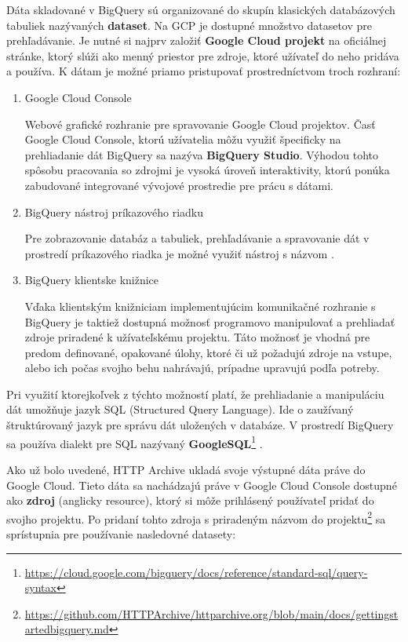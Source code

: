 Dáta skladované v BigQuery sú organizované do skupín klasických databázových tabuliek nazývaných \textbf{dataset}.
Na GCP je dostupné množstvo datasetov pre prehľadávanie.
Je nutné si najprv založiť \textbf{Google Cloud projekt} na oficiálnej stránke, ktorý slúži ako menný priestor pre zdroje, ktoré užívateľ do neho pridáva a používa.
K dátam je možné priamo pristupovať prostredníctvom troch rozhraní: \cite{google-cloud} 
\begin{enumerate}
    \item Google Cloud Console

    Webové grafické rozhranie pre spravovanie Google Cloud projektov. 
    Časť Google Cloud Console, ktorú užívatelia môžu využiť špecificky na prehliadanie dát BigQuery sa nazýva \textbf{BigQuery Studio}.
    Výhodou tohto spôsobu pracovania so zdrojmi je vysoká úroveň interaktivity, ktorú ponúka zabudované integrované vývojové prostredie pre prácu s dátami. 
    
    \item BigQuery nástroj príkazového riadku

    Pre zobrazovanie databáz a tabuliek, prehľadávanie a spravovanie dát v prostredí príkazového riadka je možné využiť nástroj s názvom \textbf{}. 
    
    \item BigQuery klientske knižnice

    Vďaka klientským knižniciam implementujúcim komunikačné rozhranie s BigQuery je taktiež dostupná možnosť programovo manipulovať a prehliadať zdroje priradené k užívateľskému projektu.
    Táto možnosť je vhodná pre predom definované, opakované úlohy, ktoré či už požadujú zdroje na vstupe, alebo ich počas svojho behu nahrávajú, prípadne upravujú podľa potreby.
\end{enumerate}

\pagebreak

Pri využití ktorejkoľvek z týchto možností platí, že prehliadanie a manipuláciu dát umožňuje jazyk SQL (Structured Query Language).
Ide o zaužívaný štruktúrovaný jazyk pre správu dát uložených v databáze.
V prostredí BigQuery sa používa dialekt pre SQL nazývaný \textbf{GoogleSQL}\footnote{\href{https://cloud.google.com/bigquery/docs/reference/standard-sql/query-syntax}{https://cloud.google.com/bigquery/docs/reference/standard-sql/query-syntax}} \cite{google-bq}.

Ako už bolo uvedené, HTTP Archive ukladá svoje výstupné dáta práve do Google Cloud.
Tieto dáta sa nachádzajú práve v Google Cloud Console dostupné ako \textbf{zdroj} (anglicky resource), ktorý si môže prihlásený používateľ pridať do svojho projektu.
Po pridaní tohto zdroja s priradeným názvom  do projektu\footnote{\href{https://github.com/HTTPArchive/httparchive.org/blob/main/docs/gettingstarted\_bigquery.md}{https://github.com/HTTPArchive/httparchive.org/blob/main/docs/gettingstarted\textunderscore bigquery.md}} sa sprístupnia pre používanie nasledovné datasety: \cite{httparchive-repo}

